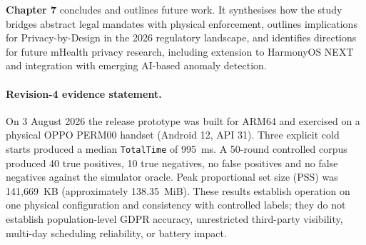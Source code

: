 \textbf{Chapter 7} concludes and outlines future work. It synthesises how the study bridges abstract legal mandates with physical enforcement, outlines implications for Privacy-by-Design in the 2026 regulatory landscape, and identifies directions for future mHealth privacy research, including extension to HarmonyOS NEXT and integration with emerging AI-based anomaly detection.
\paragraph{Revision-4 evidence statement.}
On 3 August 2026 the release prototype was built for ARM64 and exercised on a physical OPPO PERM00 handset (Android 12, API 31). Three explicit cold starts produced a median \texttt{TotalTime} of 995~ms. A 50-round controlled corpus produced 40 true positives, 10 true negatives, no false positives and no false negatives against the simulator oracle. Peak proportional set size (PSS) was 141,669~KB (approximately 138.35~MiB). These results establish operation on one physical configuration and consistency with controlled labels; they do not establish population-level GDPR accuracy, unrestricted third-party visibility, multi-day scheduling reliability, or battery impact.
